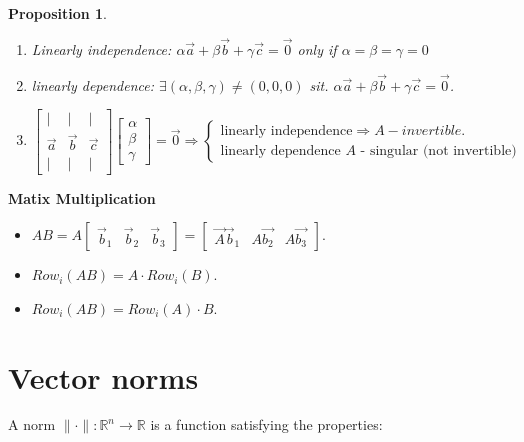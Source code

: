 \documentclass[14pt]{article}
\newtheorem{proposition}[theorem]{Proposition}
\theoremstyle{definition}
\theoremstyle{remark}
\begin{document}
\begin{multicols}{2}
    \begin{proposition}\hfill
        \begin{enumerate}
            \item Linearly independence: $\alpha \vec{a}+\beta \vec{b}+\gamma \vec{c}=\overrightarrow{0}$ only if $\alpha=\beta=\gamma=0$
            \item linearly dependence: $\exists(\alpha, \beta, \gamma) \neq(0,0,0)$ sit. $\alpha \vec{a}+\beta \vec{b}+\gamma \vec{c}=\overrightarrow{0}$.
            \item $\left[\begin{array}{lll}| & | & | \\ \vec{a} & \vec{b} & \vec{c}\\
             |      & | & |\end{array} \right]\left[\begin{array}{l}\alpha \\ \beta\\
                              \gamma\end{array}\right]=\vec{0} \Longrightarrow \begin{cases} \text{linearly independence} \Longrightarrow A-invertible. \\
                          \text{linearly dependence $A$ - singular (not invertible)}
                      \end{cases}$
        \end{enumerate}

    \end{proposition}

    \textbf{Matix Multiplication}
    \begin{itemize}
        \item $A B=A\begin{bmatrix}\vec{b}_1 & \vec{b}_2 & \vec{b}_3
                  \end{bmatrix}=\begin{bmatrix}\vec{A} \vec{b}_1 & A \overrightarrow{b_2} & A \overrightarrow{b_3}\end{bmatrix}$.
        \item $Row_i(AB)= A\cdot Row_i(B)$.
        \item $Row_i(AB)= Row_i(A)\cdot B$.
    \end{itemize}

    \section{Vector norms}
    A norm $\|\cdot\|: \mathbb{R}^{n} \rightarrow \mathbb{R}$ is a function satisfying the properties:


\end{multicols}
\end{document}
